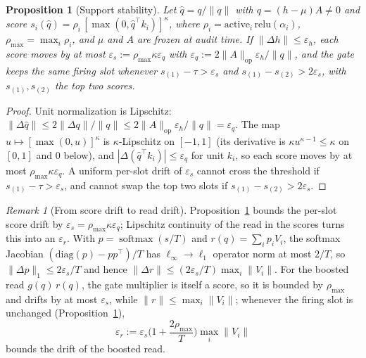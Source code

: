 \documentclass[10pt,twocolumn]{article}
\newtheorem{proposition}{Proposition}
\theoremstyle{remark}
\newtheorem{remark}{Remark}
\DeclareMathOperator{\softmax}{softmax}
\begin{document}
\begin{proposition}[Support stability]
\label{prop:support}
Let $\hat q=q/\lVert q\rVert$ with $q=(h-\mu)A\neq0$ and score
$s_i(\hat q)=\rho_i\,[\max(0,\hat q^{\top}k_i)]^{\kappa}$, where
$\rho_i=\mathrm{active}_i\,\mathrm{relu}(\alpha_i)$,
$\rho_{\max}=\max_i\rho_i$, and $\mu$ and $A$ are frozen at audit time. If
$\lVert\Delta h\rVert\le\varepsilon_h$, each score moves by at most
$\varepsilon_s:=\rho_{\max}\kappa\varepsilon_q$ with
$\varepsilon_q:=2\lVert A\rVert_{\mathrm{op}}\varepsilon_h/\lVert q\rVert$, and
the gate keeps the same firing slot whenever $s_{(1)}-\tau>\varepsilon_s$ and
$s_{(1)}-s_{(2)}>2\varepsilon_s$, with $s_{(1)},s_{(2)}$ the top two scores.
\end{proposition}
\begin{proof}
Unit normalization is Lipschitz:
$\lVert\Delta\hat q\rVert\le 2\lVert\Delta q\rVert/\lVert q\rVert
\le 2\lVert A\rVert_{\mathrm{op}}\varepsilon_h/\lVert q\rVert=\varepsilon_q$.
The map $u\mapsto[\max(0,u)]^{\kappa}$ is $\kappa$-Lipschitz on $[-1,1]$ (its
derivative is $\kappa u^{\kappa-1}\le\kappa$ on $[0,1]$ and $0$ below), and
$|\Delta(\hat q^{\top}k_i)|\le\varepsilon_q$ for unit $k_i$, so each score moves
by at most $\rho_{\max}\kappa\varepsilon_q$. A uniform per-slot drift of
$\varepsilon_s$ cannot cross the threshold if $s_{(1)}-\tau>\varepsilon_s$, and
cannot swap the top two slots if $s_{(1)}-s_{(2)}>2\varepsilon_s$.
\end{proof}

\begin{remark}[From score drift to read drift]
\label{rem:epsr}
Proposition~\ref{prop:support} bounds the per-slot score drift by
$\varepsilon_s=\rho_{\max}\kappa\varepsilon_q$; Lipschitz continuity of the
read in the scores turns this into an $\varepsilon_r$. With $p=\softmax(s/T)$
and $r(q)=\sum_i p_i V_i$, the softmax Jacobian
$(\mathrm{diag}(p)-pp^{\top})/T$ has $\ell_\infty\!\to\!\ell_1$ operator norm
at most $2/T$, so $\lVert\Delta p\rVert_1\le 2\varepsilon_s/T$ and hence
$\lVert\Delta r\rVert\le(2\varepsilon_s/T)\max_i\lVert V_i\rVert$. For the
boosted read $g(q)\,r(q)$,
the gate multiplier is itself a score, so it is bounded by $\rho_{\max}$ and
drifts by at most $\varepsilon_s$, while $\lVert r\rVert\le\max_i\lVert
V_i\rVert$; whenever the firing slot is unchanged
(Proposition~\ref{prop:support}),
\[
\varepsilon_r:=\varepsilon_s\Big(1+\frac{2\rho_{\max}}{T}\Big)\max_i\lVert V_i\rVert
\]
bounds the drift of the boosted read.
\end{remark}
\end{document}
